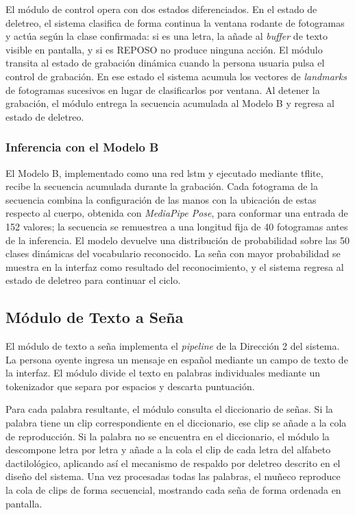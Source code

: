 El módulo de control opera con dos estados diferenciados. En el estado de deletreo, el
sistema clasifica de forma continua la ventana rodante de fotogramas y actúa según la
clase confirmada: si es una letra, la añade al \textit{buffer} de texto visible en
pantalla, y si es REPOSO no produce ninguna acción. El módulo transita al estado de
grabación dinámica cuando la persona usuaria pulsa el control de grabación. En ese estado
el sistema acumula los vectores de \textit{landmarks} de fotogramas sucesivos en lugar de
clasificarlos por ventana. Al detener la grabación, el módulo entrega la secuencia
acumulada al Modelo B y regresa al estado de deletreo.

\subsubsection{Inferencia con el Modelo B}

El Modelo B, implementado como una red \acrshort{lstm} y ejecutado mediante
\acrshort{tflite}, recibe la secuencia acumulada durante la grabación. Cada
fotograma de la secuencia combina la configuración de las manos con la ubicación de
estas respecto al cuerpo, obtenida con \textit{MediaPipe Pose}, para conformar una
entrada de 152 valores; la secuencia se remuestrea a una longitud fija de 40 fotogramas
antes de la inferencia. El modelo devuelve una distribución de probabilidad sobre las
50 clases dinámicas del vocabulario reconocido. La seña con mayor probabilidad se
muestra en la interfaz como resultado del reconocimiento, y el sistema regresa al
estado de deletreo para continuar el ciclo.

\subsection{Módulo de Texto a Seña}
\label{sec:modulo-texto-sena}

El módulo de texto a seña implementa el \textit{pipeline} de la Dirección 2 del
sistema. La persona oyente ingresa un mensaje en español mediante un campo de texto
de la interfaz. El módulo divide el texto en palabras individuales mediante un
tokenizador que separa por espacios y descarta puntuación.

Para cada palabra resultante, el módulo consulta el diccionario de señas. Si la palabra
tiene un clip correspondiente en el diccionario, ese clip se añade a la cola de
reproducción. Si la palabra no se encuentra en el diccionario, el módulo la descompone
letra por letra y añade a la cola el clip de cada letra del alfabeto dactilológico,
aplicando así el mecanismo de respaldo por deletreo descrito en el diseño del sistema.
Una vez procesadas todas las palabras, el muñeco reproduce la cola de clips de forma
secuencial, mostrando cada seña de forma ordenada en pantalla.

